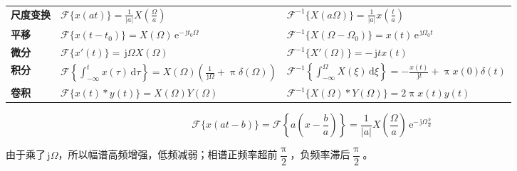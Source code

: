 \documentclass[UTF8,fontset=fandol,zihao=5]{ctexart}
\newcommand{\jj}{\,\mathrm{j}}
\newcommand{\ee}{\,\mathrm{e}}
\newcommand{\dd}{\,\mathrm{d}}
\newcommand{\FF}{\mathcal{F}}
\begin{document}
\begin{enumerate}
\begin{center}
\begin{tabularx}{0.98\textwidth}{>{\bfseries}p{1.5cm}X X}
    尺度变换
    &
    $\displaystyle
    \FF \{ x(at) \}
    =
    \frac{1}{|a|}
    X\left(\frac{\varOmega}{a}\right)
    $
    &
    $\displaystyle
    \FF^{-1} \{ X(a\varOmega) \}
    =
    \frac{1}{|a|}
    x\left(\frac{t}{a}\right)
    $
    \\

    平移
    &
    $\displaystyle
    \FF \{ x(t-t_0) \}
    =
    X(\varOmega)\ee^{-\jj t_0 \varOmega }
    $
    &
    $\displaystyle
    \FF^{-1} \{ X(\varOmega-\varOmega_0) \}
    =
    x(t)\ee^{\jj \varOmega_0 t}
    $
    \\

    微分
    &
    $\displaystyle
    \FF \{ x'(t) \}
    =
    \jj \varOmega X(\varOmega)
    $


    &
    $\displaystyle
    \FF^{-1} \{ X'(\varOmega) \}
    =
    -\jj t x(t)
    $
    \\

    积分
    &
    $\displaystyle
    \FF
    \left\{
    \int_{-\infty}^{t} x(\tau)\dd\tau
    \right\}
    =
    X(\varOmega)
    \left(
    \frac{1}{\jj\varOmega}
    +
    \uppi\delta(\varOmega)
    \right)
    $
    &
    $\displaystyle
    \FF^{-1}
    \left\{
    \int_{-\infty}^{\varOmega} X(\xi)\dd\xi
    \right\}
    =
    -\frac{x(t)}{\jj t}
    +
    \uppi x(0)\delta(t)
    $
    \\

    卷积
    &
    $\displaystyle
    \FF \{ x(t)\ast y(t) \}
    =
    X(\varOmega)Y(\varOmega)
    $
    &
    $\displaystyle
    \FF^{-1}
    \{ X(\varOmega)\ast Y(\varOmega) \}
    =
    2\uppi x(t)y(t)
    $
    \\

    \bottomrule
    \end{tabularx}
    \end{center}

\end{enumerate}

\begin{methodbox}[【技巧】时移与尺度变换对应]
  \[
  \FF \{x(at-b)\}=\FF \left\{a \left( x - \frac{b}{a} \right)\right\} = \frac{1}{|a|} X \left( \frac{\varOmega}{a} \right) \ee^{-\jj \varOmega \frac{b}{a}}
  \]
\end{methodbox}


\begin{methodbox}[【理解】微分的实际意义]
  由于乘了$\jj \varOmega$，所以幅谱高频增强，低频减弱；相谱正频率超前$\dfrac{\uppi}{2}$，负频率滞后$\dfrac{\uppi}{2}$。
\end{methodbox}
\end{document}

